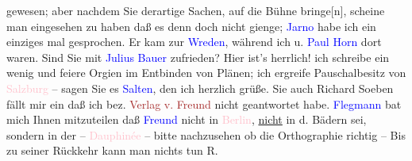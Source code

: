                gewesen; aber {\pb}nachdem Sie
               derartige Sachen,  auf die Bühne
                  bringe{[}n{]}, scheine man eingesehen zu haben daß es denn doch
               nicht gienge; \textcolor{blue}{Jarno}{}\ledrightnote{\textcolor{blue}{Josef Jarno}} habe ich ein einziges mal
               gesprochen. {\pb}Er kam zur \textcolor{blue}{Wreden}{}\ledrightnote{\textcolor{blue}{Grethe Wreden}}, während ich u. \textcolor{blue}{Paul Horn}{}\ledrightnote{\textcolor{blue}{Paul Horn}} dort waren. Sind Sie mit \textcolor{blue}{Julius Bauer}{}\ledrightnote{\textcolor{blue}{Julius Bauer}} zufrieden? Hier ist’s herrlich! ich schreibe ein
               wenig und feiere Orgien im Entbinden von Plänen; ich ergreife Pauschalbesitz von \textcolor{pink}{Salzburg}{}\ledrightnote{\textcolor{pink}{Salzburg}} – sagen Sie es \textcolor{blue}{Salten}{}\ledrightnote{\textcolor{blue}{Felix Salten}}, den ich herzlich grüße. Sie auch \spacefill\mbox{Richard}\pend
           \pstart
           \noindent{}{\pb}Soeben fällt mir ein daß ich
                  bez. \textcolor{brown}{Verlag v. Freund}{} nicht geantwortet habe. \textcolor{blue}{Flegmann}{}\ledrightnote{\textcolor{blue}{Bertha Flegmann}} bat mich Ihnen mitzuteilen daß \textcolor{blue}{Freund}{}\ledrightnote{\textcolor{blue}{Carl Freund}} nicht in \textcolor{pink}{Berlin}{}\ledrightnote{\textcolor{pink}{Berlin}}, \uline{nicht} in d. Bädern sei, sondern
                  in der – \textcolor{pink}{Dauphinée}{}\ledrightnote{\textcolor{pink}{Dauphiné}} – bitte nachzusehen ob die
                  Orthographie richtig – Bis zu seiner Rückkehr kann man nichts tun\pend
           \pstart
           \raggedleft{}\spacefill\mbox{R.}\pend
           \pstart
           \noindent{}\label{T_L00243_1v}\label{T_L00243_1h}\pend
           \endnumbering{}  
      